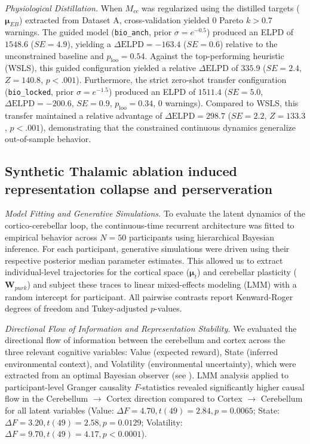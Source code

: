\documentclass[12pt, a4paper]{extarticle}
\begin{document}
\textit{Physiological Distillation.} When $M_{cc}$ was regularized using the distilled targets ($\boldsymbol{\mu}_{EB}$) extracted from Dataset A, cross-validation yielded 0 Pareto $k > 0.7$ warnings. The guided model (\texttt{bio\_anch}, prior $\sigma=e^{-0.5}$) produced an ELPD of $1548.6$ ($SE = 4.9$), yielding a $\Delta\text{ELPD} = -163.4$ ($SE = 0.6$) relative to the unconstrained baseline and $p_{\text{loo}} = 0.54$. Against the top-performing heuristic (WSLS), this guided configuration yielded a relative $\Delta\text{ELPD}$ of $335.9$ ($SE = 2.4$, $Z = 140.8$, $p < .001$). Furthermore, the strict zero-shot transfer configuration (\texttt{bio\_locked}, prior $\sigma=e^{-1.5}$) produced an ELPD of $1511.4$ ($SE = 5.0$, $\Delta\text{ELPD} = -200.6$, $SE = 0.9$, $p_{\text{loo}} = 0.34$, 0 warnings). Compared to WSLS, this transfer maintained a relative advantage of $\Delta\text{ELPD} = 298.7$ ($SE = 2.2$, $Z = 133.3$, $p < .001$), demonstrating that the constrained continuous dynamics generalize out-of-sample behavior.

\subsection{Synthetic Thalamic ablation induced representation collapse and perserveration}

\textit{Model Fitting and Generative Simulations.} To evaluate the latent dynamics of the cortico-cerebellar loop, the continuous-time recurrent architecture was fitted to empirical behavior across $N=50$ participants using hierarchical Bayesian inference. For each participant, generative simulations were driven using their respective posterior median parameter estimates. This allowed us to extract individual-level trajectories for the cortical space ($\boldsymbol{\mu}_t$) and cerebellar plasticity ($\mathbf{W}_{purk}$) and subject these traces to linear mixed-effects modeling (LMM) with a random intercept for participant. All pairwise contrasts report Kenward-Roger degrees of freedom and Tukey-adjusted $p$-values.

\textit{Directional Flow of Information and Representation Stability.} We evaluated the directional flow of information between the cerebellum and cortex across the three relevant cognitive variables: Value (expected reward), State (inferred environmental context), and Volatility (environmental uncertainty), which were extracted from an optimal Bayesian observer (see ). LMM analysis applied to participant-level Granger causality $F$-statistics revealed significantly higher causal flow in the Cerebellum $\rightarrow$ Cortex direction compared to Cortex $\rightarrow$ Cerebellum for all latent variables (Value: $\Delta F = 4.70, t(49) = 2.84, p = 0.0065$; State: $\Delta F = 3.20, t(49) = 2.58, p = 0.0129$; Volatility: $\Delta F = 9.70, t(49) = 4.17, p < 0.0001$). 
\end{document}
